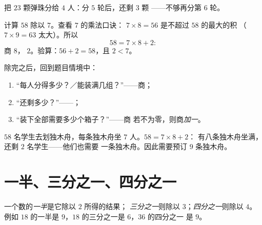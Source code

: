 \begin{omfigure}

{\small 把 $23$ 颗弹珠分给 $4$ 人：分 $5$ 轮后，还剩 $3$ 颗
——不够再分第 $6$ 轮。}
\end{omfigure}

\begin{example}\label{ex:g3:division:remainder}
计算 $58$ 除以 $7$。查看 $7$ 的乘法口诀：
$7 \times 8 = 56$ 是不超过 $58$ 的最大的积
（$7 \times 9 = 63$ 太大）。所以
\[
58 = 7 \times 8 + 2 :
\]
商 $8$， $2$。验算：$56 + 2 = 58$，且 $2 < 7$。
\end{example}

\begin{method}[解释余数]\label{met:g3:division:interpret}
除完之后，回到题目情境中：
\begin{enumerate}
  \item “每人分得多少？／能装满几组？”——商；
  \item “还剩多少？”——；
  \item “装下全部需要多少个箱子？”——商
        若不为零，则商\emph{加一}。
\end{enumerate}
\end{method}

\begin{example}\label{ex:g3:division:interpret}
$58$ 名学生去划独木舟，每条独木舟坐 $7$ 人。$58 = 7 \times 8 + 2$：
有八条独木舟坐满，还剩 $2$ 名学生——他们也需要
一条独木舟。因此需要预订 $9$ 条独木舟。
\end{example}

\section{一半、三分之一、四分之一}

\begin{definition}\label{def:g3:division:half}
一个数的\emph{一半}是它除以 $2$ 所得的结果；
\emph{三分之一}则除以 $3$；\emph{四分之一}则除以 $4$。例如
$18$ 的一半是 $9$，$18$ 的三分之一是 $6$，$36$ 的四分之一
是 $9$。
\end{definition}


